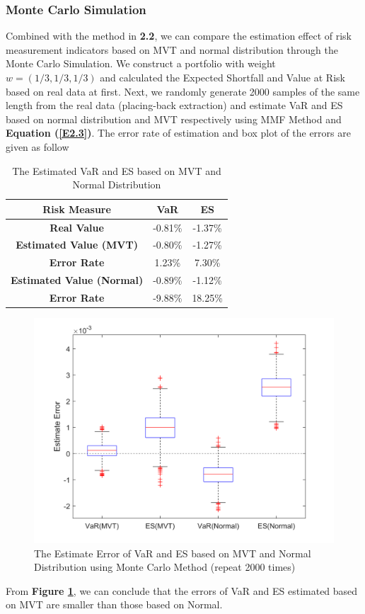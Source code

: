 \subsubsection{Monte Carlo Simulation}
Combined with the method in \textbf{2.2}, we can compare the estimation effect of risk measurement indicators based on MVT and normal distribution through the Monte Carlo Simulation. We construct a portfolio with weight $w=(1/3,1/3,1/3)$ and calculated the Expected Shortfall and Value at Risk based on real data at first. Next, we randomly generate 2000 samples of the same length from the real data (placing-back extraction) and estimate VaR and ES based on normal distribution and MVT respectively using MMF Method and \textbf{Equation (\ref{E2.3})}. The error rate of estimation and box plot of the errors are given as follow
\begin{table}[H]
    \centering
    \begin{tabular}{|c|c|c|}
    \hline
    {\bf Risk Measure} &  {\bf VaR} &   {\bf ES} \\
    \hline
    {\bf Real Value} &    -0.81\% &    -1.37\% \\
    \hline
    {\bf Estimated Value (MVT)} &    -0.80\% &    -1.27\% \\
    \hline
    {\bf Error Rate} &     1.23\% &     7.30\% \\
    \hline
    {\bf Estimated Value (Normal)} &    -0.89\% &    -1.12\% \\
    \hline
    {\bf Error Rate} &    -9.88\% &    18.25\% \\
    \hline
    \end{tabular}  
    \caption{The Estimated VaR and ES based on MVT and Normal Distribution}
    \label{Tab2}
\end{table}
\begin{figure}[H]
    \centering
    \includegraphics[scale=0.9]{Figure/FIG4-MC.png}
    \caption{The Estimate Error of VaR and ES based on MVT and Normal Distribution using Monte Carlo Method (repeat 2000 times)}
    \label{Fig4}
\end{figure}
From \textbf{Figure \ref{Fig4}}, we can conclude that the errors of VaR and ES estimated based on MVT are smaller than those based on Normal.